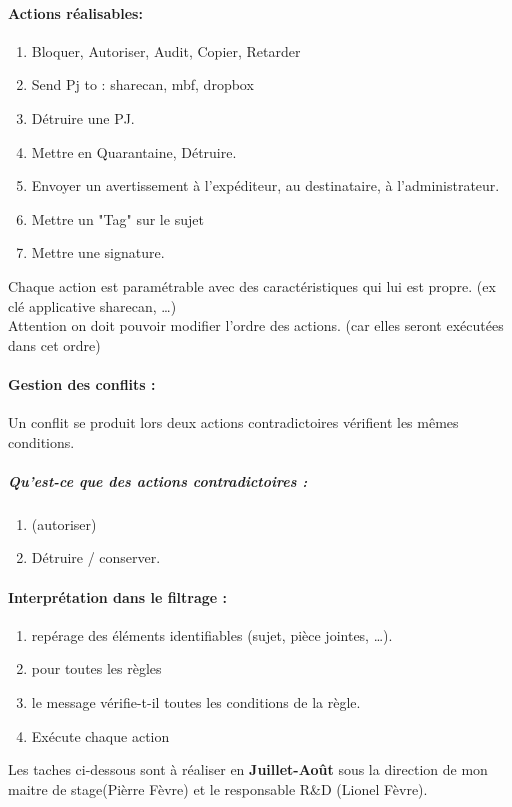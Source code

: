 \paragraph{Actions réalisables:}
\begin{enumerate}
\item Bloquer, Autoriser, Audit, Copier, Retarder
\item Send Pj to : sharecan, mbf, dropbox
\item Détruire une PJ.
\item Mettre en Quarantaine, Détruire.
\item Envoyer un avertissement à l'expéditeur, au destinataire, à l'administrateur.
\item Mettre un "Tag" sur le sujet
\item Mettre une signature.
\end{enumerate} 
Chaque action est paramétrable avec des caractéristiques qui lui est propre. (ex clé applicative sharecan, …)\\
Attention on doit pouvoir modifier l'ordre des actions. (car elles seront exécutées dans cet ordre)

\paragraph{Gestion des conflits :} 
Un conflit se produit lors deux actions contradictoires vérifient les mêmes conditions.
\subparagraph{Qu'est-ce que des actions contradictoires :}
\begin{enumerate}
 \item (autoriser)
 \item Détruire / conserver.
\end{enumerate}

\paragraph{Interprétation dans le filtrage :}
\begin{enumerate}
\item repérage des éléments identifiables (sujet, pièce jointes, …).
\item pour toutes les règles 
\item le message vérifie-t-il toutes les conditions de la règle.
\item Exécute chaque action
\end{enumerate}
Les taches ci-dessous sont à réaliser en \textbf{Juillet-Août} sous la direction de mon maitre de stage(Pièrre Fèvre) et le responsable R\&D (Lionel Fèvre).

